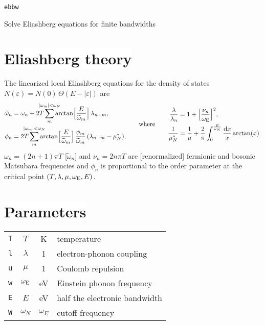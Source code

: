 \documentclass[a4paper]{article}
\def\D{\mathrm d}
\def\sub#1{\sb{\mathrm{#1}}}
\def\limit#1{\sp{\mathclap{#1}}}
\let\tilde\widetilde
\let\epsilon\varepsilon
\let\Theta\varTheta
\def\headline#1{\section*{\normalsize\normalfont%
   \rlap{\rule[0.5ex]{\textwidth}{0.4pt}}\qquad\colorbox{white}{#1}}}
\begin{document}
   \begin{center}
      \LARGE \texttt{ebbw} \par \bigskip
      \large Solve Eliashberg equations for finite bandwidths
   \end{center}

   \headline{Eliashberg theory}

   The linearized local Eliashberg equations for the density of states
   $N(\epsilon) = N(0) \, \Theta(E - |\epsilon|)$ are
   \begin{align*}
      \begin{aligned}
         \tilde \omega_n &= \omega_n + 2 T \sum_m \limit{|\omega_m| < \omega_N}
         \arctan \Bigl[ \frac E {\tilde \omega_m} \Bigr] \, \lambda_{n - m},
         \\
         \phi_n &= 2 T \sum_m \limit{|\omega_m| < \omega_N}
         \arctan \Bigl[ \frac E {\tilde \omega_m} \Bigr] \,
         \frac{\phi_m}{\tilde \omega_m} \, (\lambda_{n - m} - \mu^*_N),
      \end{aligned}
      \qquad \text{where} \qquad
      \begin{aligned}
         \frac \lambda {\lambda_n} &=
         1 + \Bigl[ \frac{\nu_n}{\omega \sub E} \Bigr]^2,
         \\
         \frac 1 {\mu^*_N} &=
         \frac 1 \mu + \frac 2 \pi \int_0^{\frac E {\omega_N}} \frac {\D x} x
         \arctan(x).
      \end{aligned}
   \end{align*}
   $\omega_n = (2 n + 1) \pi T$ [$\tilde \omega_n$] and $\nu_n = 2 n \pi T$ are
   [renormalized] fermionic and bosonic Matsubara frequencies and $\phi_n$ is
   proportional to the order parameter at the critical point $(T, \lambda, \mu,
   \omega \sub E, E)$.

   \headline{Parameters}

   \begin{center}
      \begin{tabular}{r c c l}
         \verb|T| & $T$ & K & temperature \\
         \verb|l| & $\lambda$ & 1 & electron-phonon coupling \\
         \verb|u| & $\mu$ & 1 & Coulomb repulsion \\
         \verb|w| & $\omega \sub E$ & eV & Einstein phonon frequency \\
         \verb|E| & $E$ & eV & half the electronic bandwidth \\
         \verb|W| & $\omega_N$ & $\omega_E$ & cutoff frequency
      \end{tabular}
   \end{center}
\end{document}
